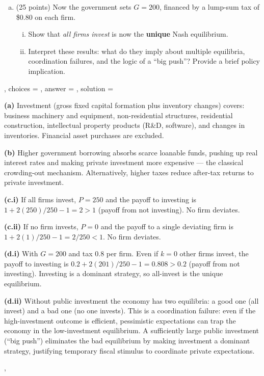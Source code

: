 {{\begin{enumerate}[(a)]
      \item (25 points) Now the government sets $G = 200$, financed by a
            lump-sum tax of \$0.80 on each firm.
            \begin{enumerate}[(i)]
              \item Show that \emph{all firms invest} is now the \textbf{unique}
                    Nash equilibrium.
              \item Interpret these results: what do they imply about
                    multiple equilibria, coordination failures, and the logic
                    of a ``big push''? Provide a brief policy implication.
            \end{enumerate}
    \end{enumerate}
  },
  choices   = {},
  answer    = {},
  solution  = {%
    \textbf{(a)} Investment (gross fixed capital formation plus inventory
    changes) covers: business machinery and equipment, non-residential
    structures, residential construction, intellectual property products
    (R\&D, software), and changes in inventories. Financial asset purchases
    are excluded.

    \textbf{(b)} Higher government borrowing absorbs scarce loanable funds,
    pushing up real interest rates and making private investment more
    expensive --- the classical crowding-out mechanism. Alternatively,
    higher taxes reduce after-tax returns to private investment.

    \textbf{(c.i)} If all firms invest, $P=250$ and the payoff to investing is
    $1 + 2(250)/250 - 1 = 2 > 1$ (payoff from not investing). No firm
    deviates.

    \textbf{(c.ii)} If no firm invests, $P=0$ and the payoff to a single
    deviating firm is $1 + 2(1)/250 - 1 = 2/250 < 1$. No firm deviates.

    \textbf{(d.i)} With $G=200$ and tax 0.8 per firm. Even if $k=0$ other
    firms invest, the payoff to investing is $0.2 + 2(201)/250 - 1 = 0.808 >
    0.2$ (payoff from not investing). Investing is a dominant strategy, so
    all-invest is the unique equilibrium.

    \textbf{(d.ii)} Without public investment the economy has two equilibria:
    a good one (all invest) and a bad one (no one invests). This is a
    coordination failure: even if the high-investment outcome is efficient,
    pessimistic expectations can trap the economy in the low-investment
    equilibrium. A sufficiently large public investment (``big push'')
    eliminates the bad equilibrium by making investment a dominant strategy,
    justifying temporary fiscal stimulus to coordinate private expectations.
  },
}
